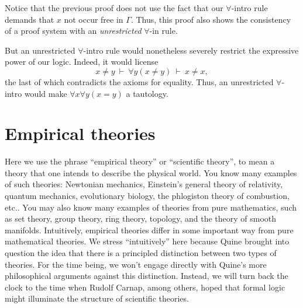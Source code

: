 \begin{disc} Notice that the previous proof does not use the fact that
  our $\forall$-intro rule demands that $x$ not occur free in
  $\Gamma$.  Thus, this proof also shows the consistency of a proof
  system with an \textit{unrestricted} $\forall$-in rule.

  But an unrestricted $\forall$-intro rule would nonetheless severely
  restrict the expressive power of our logic.  Indeed, it would
  license
  \[ x\neq y \: \vdash \: \forall y(x\neq y) \: \vdash \: x\neq x , \]
  the last of which contradicts the axioms for equality.  Thus, an
  unrestricted $\forall$-intro would make $\forall x\forall y(x=y)$ a
  tautology. 
\end{disc}





\section{Empirical theories} \label{sec:et}




Here we use the phrase ``empirical theory'' or ``scientific theory'',
to mean a theory that one intends to describe the physical world.  You
know many examples of such theories: Newtonian mechanics, Einstein's
general theory of relativity, quantum mechanics, evolutionary biology,
the phlogiston theory of combustion, etc..  You may also know many
examples of theories from pure mathematics, such as set theory, group
theory, ring theory, topology, and the theory of smooth manifolds.
Intuitively, empirical theories differ in some important way from pure
mathematical theories.  We stress ``intuitively'' here because Quine
brought into question the idea that there is a principled distinction
between two types of theories.  For the time being, we won't engage
directly with Quine's more philosophical arguments against this
distinction.  Instead, we will turn back the clock to the time when
Rudolf Carnap, among others, hoped that formal logic might illuminate
the structure of scientific theories.

